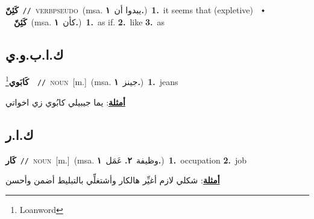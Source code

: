 \documentclass[10pt,a4paper,twoside]{article} %
\begin{document}
\begin{multicols}{2}
{\setlength\topsep{0pt}\textbf{\foreignlanguage{arabic}{كَئِنّ}}\ {\color{gray}\texttt{//}\color{black}}\ \textsc{verb\textunderscore pseudo}\ \color{gray}(msa. \foreignlanguage{arabic}{يبدوا أن}~\foreignlanguage{arabic}{\textbf{١.}})\color{black}\ \textbf{1.}~it seems that (expletive)\ \ $\smblkdiamond$\ \ \setlength\topsep{0pt}\textbf{\foreignlanguage{arabic}{كَئِنّ}}\ \color{gray}(msa. \foreignlanguage{arabic}{كأن}~\foreignlanguage{arabic}{\textbf{١.}})\color{black}\ \textbf{1.}~as if.  \textbf{2.}~like  \textbf{3.}~as\ } \vspace{2mm}

\vspace{-3mm}
\subsection*{\color{blue}\foreignlanguage{arabic}{ك.ا.ب.و.ي}\color{blue}{ (ntws)}} 

{\setlength\topsep{0pt}\textbf{\foreignlanguage{arabic}{كَابَوي}}\footnote{Loanword}\ \ {\color{gray}\texttt{//}\color{black}}\ \textsc{noun}\ [m.]\ \color{gray}(msa. \foreignlanguage{arabic}{جينز}~\foreignlanguage{arabic}{\textbf{١.}})\color{black}\ \textbf{1.}~jeans\  \begin{flushright}\color{gray}\foreignlanguage{arabic}{\textbf{\underline{\foreignlanguage{arabic}{أمثلة}}}: يما جيبيلي كابُوي زي اخواتي}\end{flushright}\color{black}} \vspace{2mm}

\vspace{-3mm}
\subsection*{\color{blue}\foreignlanguage{arabic}{ك.ا.ر}\color{blue}{ (ntws)}} 

{\setlength\topsep{0pt}\textbf{\foreignlanguage{arabic}{كَار}}\ {\color{gray}\texttt{//}\color{black}}\ \textsc{noun}\ [m.]\ \color{gray}(msa. \foreignlanguage{arabic}{وظيفة}~\foreignlanguage{arabic}{\textbf{٢.}}  \foreignlanguage{arabic}{عَمَل}~\foreignlanguage{arabic}{\textbf{١.}})\color{black}\ \textbf{1.}~occupation  \textbf{2.}~job\  \begin{flushright}\color{gray}\foreignlanguage{arabic}{\textbf{\underline{\foreignlanguage{arabic}{أمثلة}}}: شكلي لازم أغيِّر هالكار وأشتغلِّي بالتبليط أضمن وأحسن}\end{flushright}\color{black}} \vspace{2mm}


\end{multicols}
\end{document}
